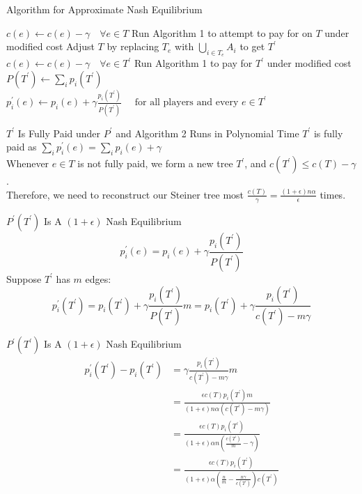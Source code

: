 \documentclass[11pt,aspectratio=169]{beamer}
\begin{document}
\begin{frame}{Algorithm for Approximate Nash Equilibrium}
    \begin{algorithm}[H]
        \begin{algorithmic}[2]
            \STATE $c(e) \gets  c(e) -\gamma \quad \forall e \in T$
            \STATE Run Algorithm 1 to attempt to pay for on $T$ under modified cost
            \STATE  Adjust \( T\) by replacing \(T_e\) with  \(\bigcup_{i\in T_e} A_i\) to get \(T^{'}\)
            \STATE $c(e) \gets  c(e) -\gamma \quad \forall e \in T^{'}$
            \STATE Run Algorithm 1 to pay for $T^{'}$ under modified cost
            \STATE $P(T^{'}) \gets \sum_i p_i(T^{'})$
            \STATE $p_i^{'}(e) \gets p_i(e) + \gamma\frac{p_i(T^{'})}{P(T^{'})}\quad \text{ for all players and every } e \in T^{'}$
            \ENDIF
            \ENDWHILE
        \end{algorithmic}
        \caption{pseudocode for approximate Nash Equilibrium }
        \end{algorithm}
\end{frame}

\begin{frame}{$T^{'}$ Is Fully Paid under $P^{'}$ and Algorithm 2 Runs in Polynomial Time}
    $T^{'}$ is fully paid as $\sum_i p_i^{'}(e) = \sum_i p_i(e) + \gamma$\\
    \vspace{15pt}
    Whenever \( e \in T \) is not fully paid, we form a new tree $T^{'}$, and $c(T^{'}) \leq c(T) - \gamma $.\\
    Therefore, we need to reconstruct our Steiner tree most  $\frac{c(T)}{\gamma} = \frac{(1+\epsilon)n\alpha }{\epsilon}$ times.

\end{frame}

\begin{frame}{$P^{'}(T^{'})$ Is A $(1+\epsilon)$ Nash Equilibrium}
    \[p_i^{'}(e) = p_i(e) + \gamma\frac{p_i(T^{'})}{P(T^{'})}\]
    \vspace{10pt}
    Suppose $T^{'}$ has $m$ edges:
    \[p_i^{'}(T^{'}) = p_i(T^{'}) + \gamma\frac{p_i(T^{'})}{P(T^{'})}m = p_i(T^{'}) + \gamma\frac{p_i(T^{'})}{c(T^{'}) - m\gamma}\]
    
\end{frame}

\begin{frame}{$P^{'}(T^{'})$ Is A $(1+\epsilon)$ Nash Equilibrium}
    \begin{align*}
    p_i^{'}(T^{'}) - p_i(T^{'}) &=  \gamma\frac{p_i(T^{'})}{c(T^{'}) - m\gamma}m\\  &= \frac{\epsilon c(T) p_i(T^{'}) m }{(1+\epsilon)n\alpha(c(T^{'}) - m\gamma)}  \\ &=  \frac{\epsilon c(T) p_i(T^{'})}{(1+\epsilon)\alpha n(\frac{c(T^{'})}{m} - \gamma)} \\ &=  \frac{\epsilon c(T) p_i(T^{'})}{(1+\epsilon)\alpha (\frac{n}{m} - \frac{n\gamma}{c(T^{'})})c(T^{'})}   
    \end{align*}
\end{frame}
\end{document}
